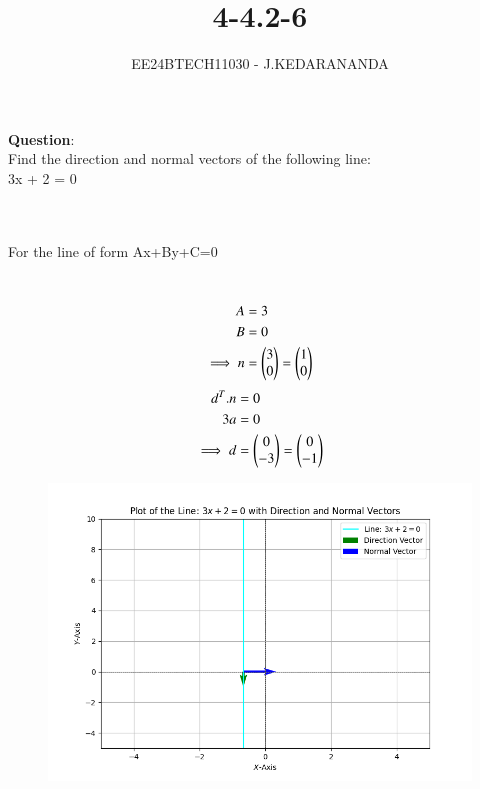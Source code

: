 \documentclass[journal]{IEEEtran}
\numberwithin{equation}{enumi}
\numberwithin{figure}{enumi}
\begin{document}

\title{4-4.2-6}
\author{EE24BTECH11030 - J.KEDARANANDA}
{\let\newpage\relax\maketitle}
\textbf{Question}:\\
Find the direction and normal vectors of the following line:\\
3x + 2 = 0
\\
\solution \\
\begin{table}[h!]
  \centering
  
  \caption{}
  \label{tabQuestion-4-4.2-6}
\end{table}\\
For the line of form Ax+By+C=0 
\begin{table}[h!]
  \centering
  
  \caption{}
  \label{tabQuestion-4-4.2-6}
\end{table}\\
\begin{align}
    A&=3\\
    B&=0\\
    \implies n&=\begin{pmatrix}3\\0\end{pmatrix} = \begin{pmatrix}1\\0\end{pmatrix}
\end{align}
\begin{align}
    d^T.n&=0\\
    3a&=0\\
    \implies d&=\begin{pmatrix}0\\-3\end{pmatrix} = \begin{pmatrix}0\\-1\end{pmatrix}
\end{align}
\begin{figure}[h!]
    \centering
    \includegraphics[width=\linewidth]{figs/fig1.png}
    \caption{}
\end{figure}
\end{document}
